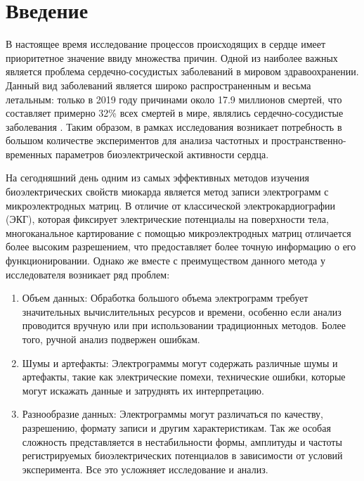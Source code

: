 \chapter{Введение}

В настоящее время исследование процессов происходящих в сердце имеет
приоритетное значение ввиду множества причин. Одной из наиболее важных является
проблема сердечно-сосудистых заболеваний в мировом здравоохранении. Данный вид
заболеваний является широко распространенным и весьма летальным: только в 2019
году причинами около 17.9 миллионов смертей, что составляет примерно 32\% всех
смертей в мире, являлись сердечно-сосудистые заболевания \cite{who}. Таким
образом, в рамках исследования возникает потребность в большом количестве
экспериментов для анализа частотных и пространственно-временных параметров
биоэлектрической активности сердца.

На сегодняшний день одним из самых эффективных методов изучения
биоэлектрических свойств миокарда является метод записи электрограмм с
микроэлектродных матриц. В отличие от классической электрокардиографии (ЭКГ),
которая фиксирует электрические потенциалы на поверхности тела, многоканальное
картирование с помощью микроэлектродных матриц отличается более высоким
разрешением, что предоставляет более точную информацию о его функционировании.
Однако же вместе с преимуществом данного метода у исследователя возникает ряд
проблем:

\begin{enumerate}
	\item Объем данных: Обработка большого объема электрограмм требует
	значительных вычислительных ресурсов и времени, особенно если анализ
	проводится вручную или при использовании традиционных методов. Более того,
	ручной анализ подвержен ошибкам.

	\item Шумы и артефакты: Электрограммы могут содержать различные шумы и
	артефакты, такие как электрические помехи, технические ошибки, которые
	могут искажать данные и затруднять их интерпретацию.

	\item Разнообразие данных: Электрограммы могут различаться по качеству,
	разрешению, формату записи и другим характеристикам. Так же особая
	сложность представляется в нестабильности формы, амплитуды и частоты
	регистрируемых биоэлектрических потенциалов в зависимости от условий
	эксперимента. Все это усложняет исследование и анализ.
\end{enumerate}

